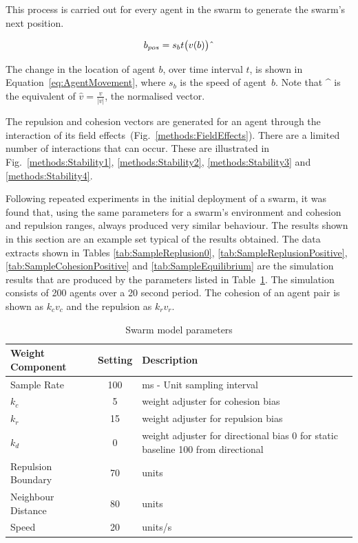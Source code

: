 \documentclass{ieeeaccess}
\begin{document}
This process is carried out for every agent in the swarm to generate the
swarm's next position.

\begin{center}
\begin{equation}
\label{eq:AgentMovement}
b_{pos}=s_{b}t\big(v(b)\big)\string^ 
\end{equation}
\end{center}

The change in the location of agent $b$, over time interval $t$, is shown in
Equation~\ref{eq:AgentMovement}, where $s_b$ is the speed of agent~$b$. Note
that \string^ is the equivalent of $\hat{v} = \frac{v}{|v|}$, the normalised
vector.

The repulsion and cohesion vectors are generated for an agent through the
interaction of its field effects~(Fig.~\ref{methods:FieldEffects}). There are
a limited number of interactions that can occur. These are illustrated in
Fig.~\ref{methods:Stability1}, \ref{methods:Stability2},
\ref{methods:Stability3} and \ref{methods:Stability4}.

Following repeated experiments in the initial deployment of a swarm, it was
found that, using the same parameters for a swarm's environment and
cohesion and repulsion ranges, always produced very similar behaviour.
The results shown in this section are an example set typical of the
results obtained. The data extracts shown in Tables \ref{tab:SampleReplusion0},
\ref{tab:SampleReplusionPositive}, \ref{tab:SampleCohesionPositive} and
\ref{tab:SampleEquilibrium} are the simulation results that are produced by the
parameters listed in Table~\ref{tab:MetricPhysics1}. The simulation consists of
200 agents over a 20 second period. The cohesion of an agent pair is shown as
$k_cv_c$ and the repulsion as $k_rv_r$.

\begin{table}[H]
\begin{center}
\begin{tabular}{| p{2.5cm} | c | p{3cm} |}
\hline
\bf Weight \bf Component & \bf Setting & \bf Description \\ \hline
Sample Rate & 100 & ms - Unit sampling interval\\  \hline
$k_c$ & 5 & weight adjuster for cohesion bias\\  \hline
$k_r$ & 15 & weight adjuster for repulsion  bias\\  \hline
$k_d$ & 0 & weight adjuster for directional bias 0 for static baseline 100 from directional\\  \hline
Repulsion Boundary & 70 & units\\  \hline
Neighbour Distance & 80 & units\\  \hline
Speed & 20 & units/s\\  \hline
\end{tabular}\caption{Swarm model parameters} \label{tab:MetricPhysics1}
\end{center}
\end{table}
\end{document}
